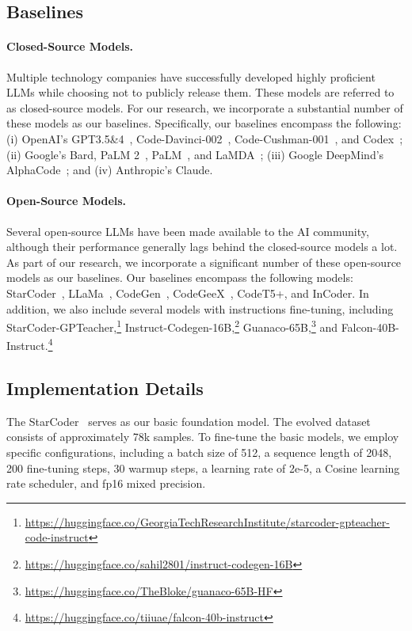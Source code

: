 \subsection{Baselines}

\paragraph{Closed-Source Models.} Multiple technology companies have successfully developed highly proficient LLMs while choosing not to publicly release them. These models are referred to as closed-source models. For our research, we incorporate a substantial number of these models as our baselines. Specifically, our baselines encompass the following: (i) OpenAI's GPT3.5\&4~\cite{GPT4}, Code-Davinci-002~\cite{Azure}, Code-Cushman-001~\cite{Azure}, and Codex~\cite{codex}; (ii) Google's Bard, PaLM 2~\cite{palm2}, PaLM~\cite{PaLM}, and LaMDA~\cite{LaMDA}; (iii) Google DeepMind's AlphaCode~\cite{AlphaCode}; and (iv) Anthropic's Claude.

\paragraph{Open-Source Models.} Several open-source LLMs have been made available to the AI community, although their performance generally lags behind the closed-source models a lot. As part of our research, we incorporate a significant number of these open-source models as our baselines. Our baselines encompass the following models: StarCoder~\cite{li2023starcoder}, LLaMa~\cite{llama}, CodeGen~\cite{codegen}, CodeGeeX~\cite{CodeGeeX}, CodeT5+\cite{CodeT5+}, and InCoder\cite{incoder}. In addition, we also include several models with instructions fine-tuning, including StarCoder-GPTeacher,\footnote{\url{https://huggingface.co/GeorgiaTechResearchInstitute/starcoder-gpteacher-code-instruct}} Instruct-Codegen-16B,\footnote{\url{https://huggingface.co/sahil2801/instruct-codegen-16B}} Guanaco-65B,\footnote{\url{https://huggingface.co/TheBloke/guanaco-65B-HF}} and Falcon-40B-Instruct.\footnote{\url{https://huggingface.co/tiiuae/falcon-40b-instruct}}

\subsection{Implementation Details}

The StarCoder~\cite{li2023starcoder} serves as our basic foundation model. The evolved dataset consists of approximately 78k samples. To fine-tune the basic models, we employ specific configurations, including a batch size of 512, a sequence length of 2048, 200 fine-tuning steps, 30 warmup steps, a learning rate of 2e-5, a Cosine learning rate scheduler, and fp16 mixed precision.

